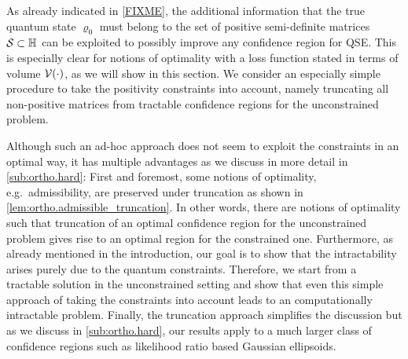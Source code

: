 As already indicated in \cref{FIXME}, the additional information that the true quantum state $\varrho_0$ must belong to the set of positive semi-definite matrices $\mathcal{S} \subset \mathbb{H}$ can be exploited to possibly improve any confidence region for QSE.
This is especially clear for notions of optimality with a loss function stated in terms of volume $\mathcal{V}(\cdot)$, as we will show in this section.
We consider an especially simple procedure to take the positivity constraints into account, namely truncating all non-positive matrices from tractable confidence regions for the unconstrained problem.

Although such an ad-hoc approach does not seem to exploit the constraints in an optimal way, it has multiple advantages as we discuss in more detail in \cref{sub:ortho.hard}:
First and foremost, some notions of optimality, e.g.\ admissibility, are preserved under truncation as shown in \cref{lem:ortho.admissible_truncation}.
In other words, there are notions of optimality such that truncation of an optimal confidence region for the unconstrained problem gives rise to an optimal region for the constrained one.
Furthermore, as already mentioned in the introduction, our goal is to show that the intractability arises purely due to the quantum constraints.
Therefore, we start from a tractable solution in the unconstrained setting and show that even this simple approach of taking the constraints into account leads to an computationally intractable problem.
Finally, the truncation approach simplifies the discussion but as we discuss in \cref{sub:ortho.hard}, our results apply to a much larger class of confidence regions such as likelihood ratio based Gaussian ellipsoids.\\


